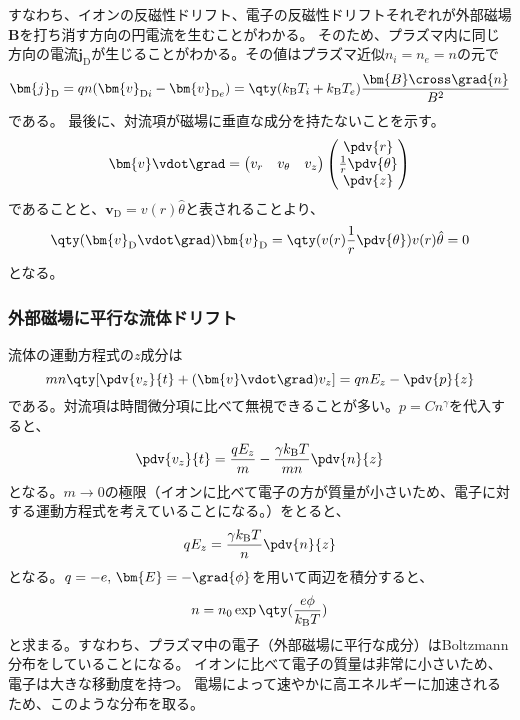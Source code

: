 すなわち、イオンの反磁性ドリフト、電子の反磁性ドリフトそれぞれが外部磁場$\bm{B}$を打ち消す方向の円電流を生むことがわかる。
そのため、プラズマ内に同じ方向の電流$\bm{j}_{\text{D}}$が生じることがわかる。その値はプラズマ近似$n_i=n_e=n$の元で
\begin{equation}
	\bm{j}_{\text{D}} = qn(\bm{v}_{\text{D}i} - \bm{v}_{\text{D}e}) = \qty(k_{\text{B}}T_i + k_{\text{B}}T_e)\frac{\bm{B}\cross\grad{n}}{B^2}
\end{equation}
である。
最後に、対流項が磁場に垂直な成分を持たないことを示す。
\begin{equation}
	\bm{v}\vdot\grad =
	\begin{pmatrix}
		v_r & v_\theta & v_z
	\end{pmatrix}
	\begin{pmatrix}
		\pdv{r}                 \\
		\frac{1}{r}\pdv{\theta} \\
		\pdv{z}
	\end{pmatrix}
\end{equation}
であることと、$\bm{v}_{\text{D}} = v(r)\hat{\theta}$と表されることより、
\begin{equation}
	\qty(\bm{v}_{\text{D}}\vdot\grad)\bm{v}_{\text{D}} = \qty(v(r)\frac{1}{r}\pdv{\theta})v(r)\hat{\theta} = 0
\end{equation}
となる。

\subsubsection{外部磁場に平行な流体ドリフト}
流体の運動方程式の$z$成分は
\begin{equation}
	mn\qty[\pdv{v_z}{t} + (\bm{v}\vdot\grad)v_z] = qnE_z - \pdv{p}{z}
\end{equation}
である。対流項は時間微分項に比べて無視できることが多い。$p=Cn^\gamma$を代入すると、
\begin{equation}
	\pdv{v_z}{t} = \frac{qE_z}{m} - \frac{\gamma k_{\text{B}}T}{mn}\pdv{n}{z}
\end{equation}
となる。$m\to 0$の極限（イオンに比べて電子の方が質量が小さいため、電子に対する運動方程式を考えていることになる。）をとると、
\begin{equation}
	qE_z = \frac{\gamma{}k_{\text{B}}T}{n}\pdv{n}{z}
\end{equation}
となる。$q=-e,\,\bm{E} = -\grad{\phi}$を用いて両辺を積分すると、
\begin{equation}
	n=n_0\exp\qty(\frac{e\phi}{k_{\text{B}}T})
\end{equation}
と求まる。すなわち、プラズマ中の電子（外部磁場に平行な成分）はBoltzmann分布をしていることになる。
イオンに比べて電子の質量は非常に小さいため、電子は大きな移動度を持つ。
電場によって速やかに高エネルギーに加速されるため、このような分布を取る。

